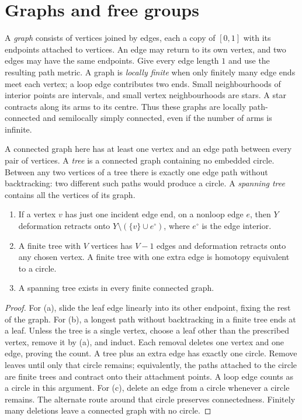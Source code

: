 \section{Graphs and free groups}\label{sec:graphs}

A \emph{graph} consists of vertices joined by edges, each a copy of $[0,1]$ with its endpoints attached to vertices. An edge may return to its own vertex, and two edges may have the same endpoints. Give every edge length $1$ and use the resulting path metric. A graph is \emph{locally finite} when only finitely many edge ends meet each vertex; a loop edge contributes two ends. Small neighbourhoods of interior points are intervals, and small vertex neighbourhoods are stars. A star contracts along its arms to its centre. Thus these graphs are locally path-connected and semilocally simply connected, even if the number of arms is infinite.

A connected graph here has at least one vertex and an edge path between every pair of vertices. A \emph{tree} is a connected graph containing no embedded circle. Between any two vertices of a tree there is exactly one edge path without backtracking: two different such paths would produce a circle. A \emph{spanning tree} contains all the vertices of its graph.

\begin{lemma}\label{lem:trees}
\begin{enumerate}
\item[(a)] If a vertex $v$ has just one incident edge end, on a nonloop edge $e$, then $Y$ deformation retracts onto $Y\setminus(\{v\}\cup e^\circ)$, where $e^\circ$ is the edge interior.
\item[(b)] A finite tree with $V$ vertices has $V-1$ edges and deformation retracts onto any chosen vertex. A finite tree with one extra edge is homotopy equivalent to a circle.
\item[(c)] A spanning tree exists in every finite connected graph.
\end{enumerate}
\end{lemma}

\begin{proof}
For (a), slide the leaf edge linearly into its other endpoint, fixing the rest of the graph. For (b), a longest path without backtracking in a finite tree ends at a leaf. Unless the tree is a single vertex, choose a leaf other than the prescribed vertex, remove it by (a), and induct. Each removal deletes one vertex and one edge, proving the count. A tree plus an extra edge has exactly one circle. Remove leaves until only that circle remains; equivalently, the paths attached to the circle are finite trees and contract onto their attachment points. A loop edge counts as a circle in this argument. For (c), delete an edge from a circle whenever a circle remains. The alternate route around that circle preserves connectedness. Finitely many deletions leave a connected graph with no circle.
\end{proof}

